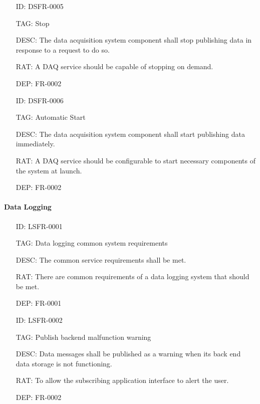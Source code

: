         \begin{itemize}
          \setlength{\itemindent}{.5in}
          \itemsep .15em
          \item[ID:] DSFR-0005
          \item[TAG:] Stop
          \item[DESC:] The data acquisition system component shall stop
            publishing data in response to a request to do so.
          \item[RAT:] A DAQ service should be capable of stopping on demand.
          \item[DEP:] FR-0002
        \end{itemize}

        \begin{itemize}
          \setlength{\itemindent}{.5in}
          \itemsep .15em
          \item[ID:] DSFR-0006
          \item[TAG:] Automatic Start
          \item[DESC:] The data acquisition system component shall start
            publishing data immediately.
          \item[RAT:] A DAQ service should be configurable to start necessary
            components of the system at launch.
          \item[DEP:] FR-0002
        \end{itemize}

      \paragraph{Data Logging}

        \begin{itemize}
          \setlength{\itemindent}{.5in}
          \itemsep .15em
          \item[ID:] LSFR-0001
          \item[TAG:] Data logging common system requirements
          \item[DESC:] The common service requirements shall be met.
          \item[RAT:] There are common requirements of a data logging system
            that should be met.
          \item[DEP:] FR-0001
        \end{itemize}

        \begin{itemize}
          \setlength{\itemindent}{.5in}
          \itemsep .15em
          \item[ID:] LSFR-0002
          \item[TAG:] Publish backend malfunction warning
          \item[DESC:] Data messages shall be published as a warning when its
            back end data storage is not functioning.
          \item[RAT:] To allow the subscribing application interface to alert
            the user.
          \item[DEP:] FR-0002
        \end{itemize}


